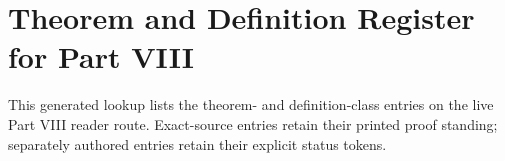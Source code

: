 \section*{Theorem and Definition Register for Part VIII}
\label{sec:p08-theorem-definition-register}

This generated lookup lists the theorem- and definition-class entries on the
live Part VIII reader route.  Exact-source entries retain their printed proof
standing; separately authored entries retain their explicit status tokens.

